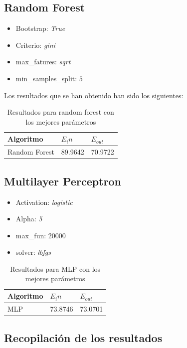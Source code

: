 \documentclass[a4paper,11pt]{article}
\begin{document}
\subsection{Random Forest}

\begin{itemize}
    \item Bootstrap: \textit{True}
    \item Criterio: \textit{gini}
    \item max\_fatures: \textit{sqrt}
    \item min\_samples\_split: $5$
\end{itemize}

Los resultados que se han obtenido han sido los siguientes:

\begin{table}[h!]
\centering
\begin{tabular}{|l|l|l|}
\hline
Algoritmo    & $E_in$  & $E_{out}$ \\ \hline
Random Forest   & 89.9642 & 70.9722 \\ \hline
\end{tabular}
\caption{Resultados para random forest con los mejores parámetros}
\end{table}

\subsection{Multilayer Perceptron}

\begin{itemize}
    \item Activation: \textit{logistic}
    \item Alpha: \textit{5}
    \item max\_fun: 20000
    \item solver: \textit{lbfgs}
\end{itemize}

\begin{table}[h!]
    \centering
    \begin{tabular}{|l|l|l|}
    \hline
    Algoritmo    & $E_in$  & $E_{out}$ \\ \hline
    MLP   & 73.8746 & 73.0701 \\ \hline
    \end{tabular}
    \caption{Resultados para MLP con los mejores parámetros}
\end{table}

\subsection{Recopilación de los resultados}
\end{document}
